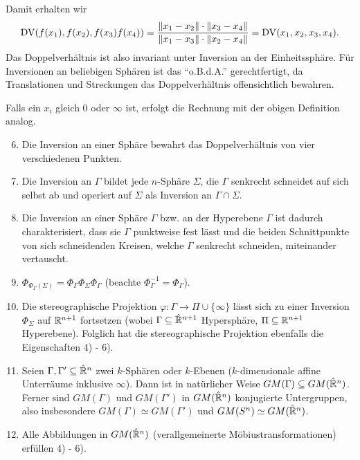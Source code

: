 Damit erhalten wir
\[ \operatorname{DV}( f(x_1), f(x_2), f(x_3) f(x_4) ) = \frac{ \| x_1 - x_2 \| \cdot \| x_3 -
    x_4 \| }{ \| x_1 - x_3 \| \cdot \| x_2 - x_4 \| } = \operatorname{DV}( x_1, x_2, x_3, x_4
  ). \]
Das Doppelverhältnis ist also invariant unter Inversion an der Einheitssphäre.
Für Inversionen an beliebigen Sphären ist das ``o.B.d.A.'' gerechtfertigt, da
Translationen und Streckungen das Doppelverhältnis offensichtlich bewahren. 

Falls ein $x_i$ gleich 0 oder $\infty$ ist, erfolgt die Rechnung mit der obigen
Definition analog. 

\addtocounter{thm}{-1}
\begin{thm}[Fortsetzung]
 \begin{enumerate}[1)]
  \setcounter{enumi}{5}
  \item Die Inversion an einer Sphäre bewahrt das Doppelverhältnis von vier
    verschiedenen Punkten. 
  \item Die Inversion an $\Gamma$ bildet jede $n$-Sphäre $\Sigma$, die $\Gamma$
    senkrecht schneidet auf sich selbst ab und operiert auf $\Sigma$ als
    Inversion an $\Gamma \cap \Sigma$.
  \item Die Inversion an einer Sphäre $\Gamma$ bzw. an der Hyperebene $\Gamma$
    ist dadurch charakterisiert, dass sie $\Gamma$ punktweise fest lässt und die
    beiden Schnittpunkte von sich schneidenden Kreisen, welche $\Gamma$
    senkrecht schneiden, miteinander vertauscht.
  \item $\Phi_{\Phi_\Gamma(\Sigma)} = \Phi_\Gamma \Phi_\Sigma \Phi_\Gamma$
    (beachte $\Phi_\Gamma^{-1} = \Phi_\Gamma$). 
  \item Die stereographische Projektion $\varphi: \Gamma \to \Pi \cup \{ \infty
    \}$ lässt sich zu einer Inversion $\Phi_\Sigma$ auf $\mathbb{R}^{n+1}$ fortsetzen
    (wobei $\Gamma \subseteq \hat{\mathbb{R}}^{n+1}$ Hypersphäre, $\Pi \subseteq
    \mathbb{R}^{n+1}$ Hyperebene). Folglich hat die stereographische Projektion
    ebenfalls die Eigenschaften 4) - 6). 
  \item Seien $\Gamma, \Gamma' \subseteq \hat{\mathbb{R}}^n$ zwei $k$-Sphären oder
    $k$-Ebenen ($k$-dimensionale affine Unterräume inklusive $\infty$). Dann ist
    in natürlicher Weise $GM(\Gamma) \subseteq GM(\hat{\mathbb{R}}^n)$. Ferner sind
    $GM(\Gamma)$ und $GM(\Gamma')$ in $GM(\hat{\mathbb{R}}^n)$ konjugierte
    Untergruppen, also insbesondere $GM(\Gamma) \simeq GM(\Gamma')$ und $GM(S^n)
    \simeq GM(\hat{\mathbb{R}}^n)$. 
  \item Alle Abbildungen in $GM(\hat{\mathbb{R}}^n)$ (verallgemeinerte
    Möbiustransformationen) erfüllen 4) - 6). 
 \end{enumerate}
\end{thm}


